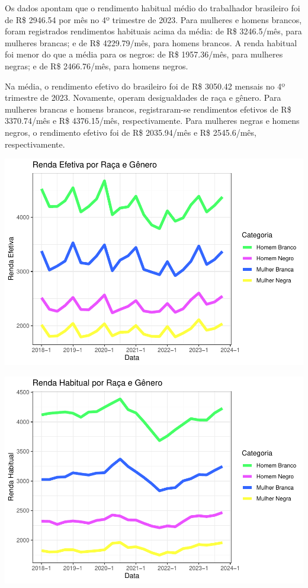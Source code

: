 \documentclass[
]{article}
\begin{document}
Os dados apontam que o rendimento habitual médio do trabalhador
brasileiro foi de R\$ 2946.54 por mês no 4º trimestre de 2023. Para
mulheres e homens brancos, foram registrados rendimentos habituais acima
da média: de R\$ 3246.5/mês, para mulheres brancas; e de R\$
4229.79/mês, para homens brancos. A renda habitual foi menor do que a
média para os negros: de R\$ 1957.36/mês, para mulheres negras; e de R\$
2466.76/mês, para homens negros.

Na média, o rendimento efetivo do brasileiro foi de R\$ 3050.42 mensais
no 4º trimestre de 2023. Novamente, operam desigualdades de raça e
gênero. Para mulheres brancas e homens brancos, registraram-se
rendimentos efetivos de R\$ 3370.74/mês e R\$ 4376.15/mês,
respectivamente. Para mulheres negras e homens negros, o rendimento
efetivo foi de R\$ 2035.94/mês e R\$ 2545.6/mês, respectivamente.

\includegraphics{R-Markdown--Long-Version-_files/figure-latex/unnamed-chunk-21-1.pdf}

\includegraphics{R-Markdown--Long-Version-_files/figure-latex/unnamed-chunk-23-1.pdf}
\end{document}
